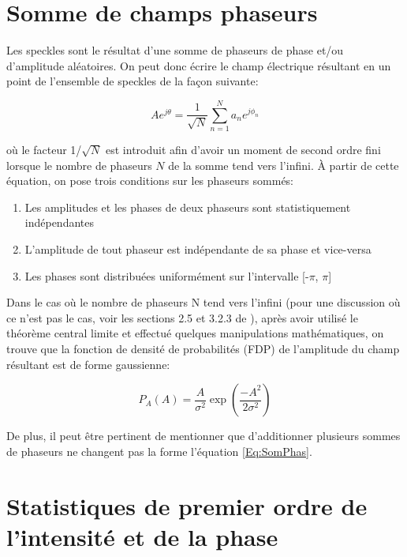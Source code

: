 \documentclass{article}       %
\begin{document}
\section{Somme de champs phaseurs}

Les speckles sont le résultat d'une somme de phaseurs de phase et/ou d'amplitude aléatoires. On peut donc écrire le champ électrique résultant en un point de l'ensemble de speckles de la façon suivante:

\begin{equation}
\label{Eq:SomPhas}
    A e^{j\theta} = \frac{1}{\sqrt{N}}\sum_{n=1}^{N}a_{n}e^{j\phi_{n}}
\end{equation}

où le facteur 1/$\sqrt{N}$ est introduit afin d'avoir un moment de second ordre fini lorsque le nombre de phaseurs $N$ de la somme tend vers l'infini. À partir de cette équation, on pose trois conditions sur les phaseurs sommés:\\
\begin{enumerate}
    \item Les amplitudes et les phases de deux phaseurs sont statistiquement indépendantes
    \item L'amplitude de tout phaseur est indépendante de sa phase et vice-versa
    \item Les phases sont distribuées uniformément sur l'intervalle [-$\pi$, $\pi$]
\end{enumerate}
\bigskip

Dans le cas où le nombre de phaseurs N tend vers l'infini (pour une discussion où ce n'est pas le cas, voir les sections 2.5 et 3.2.3 de \cite{Manuel}), après avoir utilisé le théorème central limite et effectué quelques manipulations mathématiques, on trouve que la fonction de densité de probabilités (FDP) de l'amplitude du champ résultant est de forme gaussienne:

\begin{equation}
\label{Eq:FDPAmp}
    P_{A}(A) = \frac{A}{\sigma^2}\exp\left(\frac{-A^2}{2\sigma^2}\right)
\end{equation}

De plus, il peut être pertinent de mentionner que d'additionner plusieurs sommes de phaseurs ne changent pas la forme l'équation \ref{Eq:SomPhas}.\\

\bigskip

\section{Statistiques de premier ordre de l'intensité et de la phase}
\label{Sec:PremierOrdre}
\end{document}
